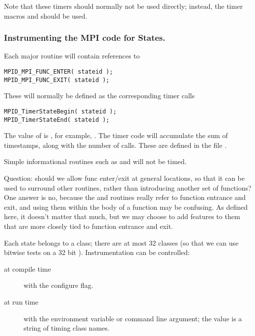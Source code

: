 \documentclass{article}
\begin{document}
Note that these timers should normally not be used directly; instead,
the timer macros  and
 should be used.  

\subsubsection{Instrumenting the MPI code for States.}
Each major routine will contain references to 
\begin{verbatim}
MPID_MPI_FUNC_ENTER( stateid );
MPID_MPI_FUNC_EXIT( stateid );
\end{verbatim}
These will normally be defined as the corresponding timer calls
\begin{verbatim}
MPID_TimerStateBegin( stateid );
MPID_TimerStateEnd( stateid );
\end{verbatim}
The value of  is , for example,
.  The timer code will accumulate the sum of
timestamps, along with the number of calls.  These are defined in the file
. 

Simple informational routines such as  and
 will not be timed.


Question: should we allow func enter/exit at general
locations, so that it can be used to surround other routines, rather
than introducing another set of functions?  One answer is no, because
the  and  routines really refer
to function entrance and exit, and using them within the body of a
function may be confusing.  As defined here, it doesn't matter that
much, but we may choose to add features to them that are more closely
tied to function entrance and exit.

Each state belongs to a class; there are at most 32 classes (so that we can use
bitwise tests on a 32 bit ).  Instrumentation can be
controlled:
\begin{description}
\item[at compile time]with the  configure flag.
\item[at run time]with the  environment variable or
   command line argument; the value is a string of timing
  class names.
\end{description}
\end{document}
